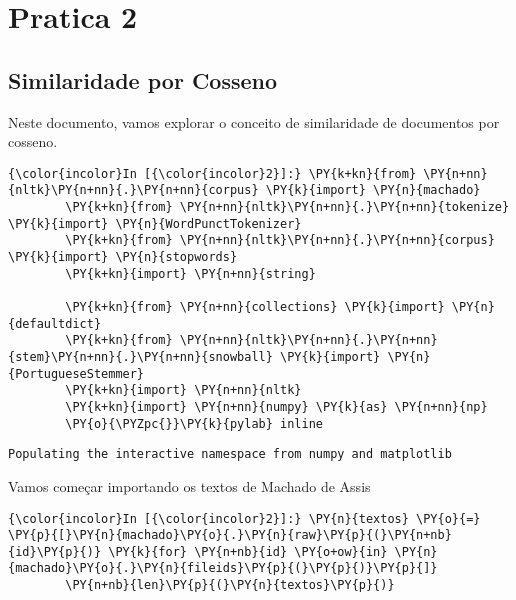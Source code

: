 \chapter{Pratica 2}

    
    

    
    \section{Similaridade por Cosseno}\label{similaridade-por-cosseno}

Neste documento, vamos explorar o conceito de similaridade de documentos
por cosseno.

    \begin{Verbatim}[commandchars=\\\{\}]
{\color{incolor}In [{\color{incolor}2}]:} \PY{k+kn}{from} \PY{n+nn}{nltk}\PY{n+nn}{.}\PY{n+nn}{corpus} \PY{k}{import} \PY{n}{machado}
        \PY{k+kn}{from} \PY{n+nn}{nltk}\PY{n+nn}{.}\PY{n+nn}{tokenize} \PY{k}{import} \PY{n}{WordPunctTokenizer}
        \PY{k+kn}{from} \PY{n+nn}{nltk}\PY{n+nn}{.}\PY{n+nn}{corpus} \PY{k}{import} \PY{n}{stopwords}
        \PY{k+kn}{import} \PY{n+nn}{string}
        
        \PY{k+kn}{from} \PY{n+nn}{collections} \PY{k}{import} \PY{n}{defaultdict}
        \PY{k+kn}{from} \PY{n+nn}{nltk}\PY{n+nn}{.}\PY{n+nn}{stem}\PY{n+nn}{.}\PY{n+nn}{snowball} \PY{k}{import} \PY{n}{PortugueseStemmer}
        \PY{k+kn}{import} \PY{n+nn}{nltk}
        \PY{k+kn}{import} \PY{n+nn}{numpy} \PY{k}{as} \PY{n+nn}{np}
        \PY{o}{\PYZpc{}}\PY{k}{pylab} inline
\end{Verbatim}

    \begin{Verbatim}[commandchars=\\\{\}]
Populating the interactive namespace from numpy and matplotlib

    \end{Verbatim}

    Vamos começar importando os textos de Machado de Assis

    \begin{Verbatim}[commandchars=\\\{\}]
{\color{incolor}In [{\color{incolor}2}]:} \PY{n}{textos} \PY{o}{=} \PY{p}{[}\PY{n}{machado}\PY{o}{.}\PY{n}{raw}\PY{p}{(}\PY{n+nb}{id}\PY{p}{)} \PY{k}{for} \PY{n+nb}{id} \PY{o+ow}{in} \PY{n}{machado}\PY{o}{.}\PY{n}{fileids}\PY{p}{(}\PY{p}{)}\PY{p}{]}
        \PY{n+nb}{len}\PY{p}{(}\PY{n}{textos}\PY{p}{)}
\end{Verbatim}

